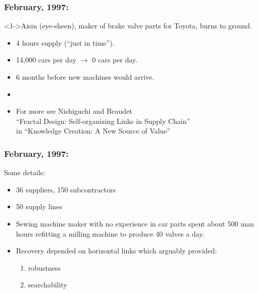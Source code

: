 \begin{frame}
  \frametitle{February, 1997:}

  \begin{block}<1->{Aisin (eye-sheen), maker of brake valve parts for Toyota, burns to ground.\cite{nishiguchi2000a}}
    \begin{itemize}
    \item<2->
      4 hours supply (``just in time'').
    \item<3->
      14,000 cars per day $\rightarrow$ 0 cars per day.
    \item<4->
      6 months before new machines would arrive.
    \item<5-> 
    \end{itemize}
  \end{block}

  \begin{itemize}
  \item 
    For more see Nishiguchi and Beaudet\cite{nishiguchi2000a}\\
    ``Fractal Design: Self-organizing Links in Supply Chain''\\
    in ``Knowledge Creation: A New Source of Value''
  \end{itemize}
  

\end{frame}

\begin{frame}
  \frametitle{February, 1997:}

  \begin{block}{Some details:}
    \begin{itemize}
    \item<+->
      36 suppliers, 150 subcontractors
    \item<+-> 
      50 supply lines
    \item<+-> 
      Sewing machine maker with no experience in car parts
      spent about 500 man hours refitting a milling machine
      to produce 40 valves a day.
    \item<+->
      Recovery depended on horizontal links which
      arguably provided:
      \begin{enumerate}
      \item<+-> 
        robustness
      \item<+->
        searchability
      \end{enumerate}
    \end{itemize}
  \end{block}

\end{frame}

